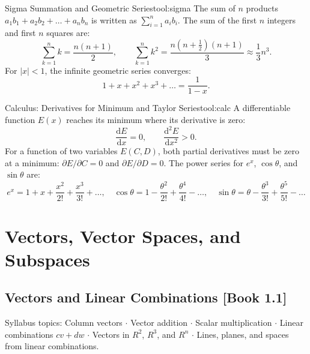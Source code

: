 \documentclass[11pt,a4paper,openany,oneside]{book}
\def\vect#1{#1}%
\def\mathbf#1{#1}%
\def\bk#1{ [Book #1]}%
\newcommand{\vect}[1]{\mathbf{#1}}
\newcommand{\diff}{\mathrm{d}}
\numberwithin{equation}{chapter}
\newcounter{tool}
\newcommand{\bk}[1]{\texorpdfstring{\enspace{\normalfont\small\color{slate}[Book #1]}}{ [Book #1]}}
\begin{document}
\begin{toolbox}{Sigma Summation and Geometric Series}{tool:sigma}
The sum of $n$ products $a_1b_1 + a_2b_2 + \dots + a_nb_n$ is written as $\sum_{i=1}^n a_i b_i$.
The sum of the first $n$ integers and first $n$ squares are:
\begin{equation}
\sum_{k=1}^n k = \frac{n(n+1)}{2}, \qquad \sum_{k=1}^n k^2 = \frac{n(n+\frac{1}{2})(n+1)}{3} \approx \frac{1}{3}n^3.
\end{equation}
For $|x| < 1$, the infinite geometric series converges:
\begin{equation}
1 + x + x^2 + x^3 + \dots = \frac{1}{1-x}.
\end{equation}
\end{toolbox}

\begin{toolbox}{Calculus: Derivatives for Minimum and Taylor Series}{tool:calc}
A differentiable function $E(x)$ reaches its minimum where its derivative is zero:
\begin{equation}
\frac{\diff E}{\diff x} = 0, \qquad \frac{\diff^2 E}{\diff x^2} > 0.
\end{equation}
For a function of two variables $E(C,D)$, both partial derivatives must be zero at a minimum: $\partial E/\partial C = 0$ and $\partial E/\partial D = 0$.
The power series for $e^x$, $\cos\theta$, and $\sin\theta$ are:
\begin{equation}
e^x = 1 + x + \frac{x^2}{2!} + \frac{x^3}{3!} + \dots, \quad \cos\theta = 1 - \frac{\theta^2}{2!} + \frac{\theta^4}{4!} - \dots, \quad \sin\theta = \theta - \frac{\theta^3}{3!} + \frac{\theta^5}{5!} - \dots
\end{equation}
\end{toolbox}

\part{Vectors, Vector Spaces, and Subspaces}

\chapter[Vectors and Linear Combinations (1.1)]{Vectors and Linear Combinations\bk{1.1}}

\begin{syll}
Syllabus topics: Column vectors $\cdot$ Vector addition $\cdot$ Scalar multiplication $\cdot$ Linear combinations $c\vect{v}+d\vect{w}$ $\cdot$ Vectors in $\mathbf{R}^2$, $\mathbf{R}^3$, and $\mathbf{R}^n$ $\cdot$ Lines, planes, and spaces from linear combinations.
\end{syll}
\end{document}
